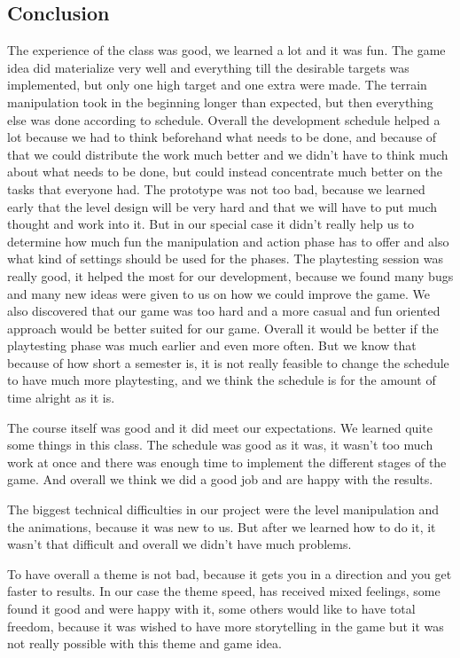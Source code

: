 \documentclass[12pt, letterpaper]{scrartcl}
\begin{document}
	\subsection{Conclusion}
	The experience of the class was good, we learned a lot and it was fun. The game idea did materialize very well and everything till the desirable targets was implemented, but only one high target and one extra were made. The terrain manipulation took in the beginning longer than expected, but then everything else was done according to schedule. Overall the development schedule helped a lot because we had to think beforehand what needs to be done, and because of that we could distribute the work much better and we didn't have to think much about what needs to be done, but could instead concentrate much better on the tasks that everyone had. The prototype was not too bad, because we learned early that the level design will be very hard and that we will have to put much thought and work into it. But in our special case it didn't really help us to determine how much fun the manipulation and action phase has to offer and also what kind of settings should be used for the phases. The playtesting session was really good, it helped the most for our development, because we found many bugs and many new ideas were given to us on how we could improve the game. We also discovered that our game was too hard and a more casual and fun oriented approach would be better suited for our game. Overall it would be better if the playtesting phase was much earlier and even more often. But we know that because of how short a semester is, it is not really feasible to change the schedule to have much more playtesting, and we think the schedule is for the amount of time alright as it is.
	
	The course itself was good and it did meet our expectations. We learned quite some things in this class. The schedule was good as it was, it wasn't too much work at once and there was enough time to implement the different stages of the game. And overall we think we did a good job and are happy with the results.
	
	The biggest technical difficulties in our project were the level manipulation and the animations, because it was new to us. But after we learned how to do it, it wasn't that difficult and overall we didn't have much problems.
	
	To have overall a theme is not bad, because it gets you in a direction and you get faster to results. In our case the theme speed, has received mixed feelings, some found it good and were happy with it, some others would like to have total freedom, because it was wished to have more storytelling in the game but it was not really possible with this theme and game idea.
	
\end{document}
